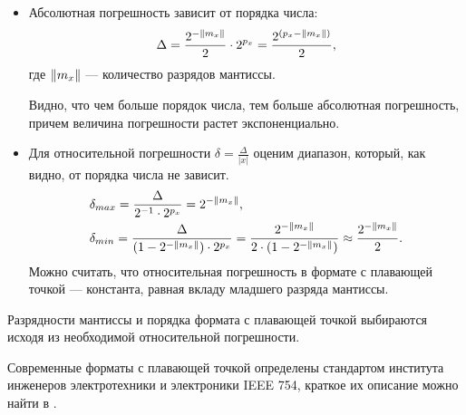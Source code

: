\begin{itemize}
    \item Абсолютная погрешность зависит от порядка числа:
    \[
        \Delta=
            \frac{2^{-\lVert m_{x}\rVert}}{2}\cdot 2^{p_{x}}=
            \frac{2^{(p_{x} - \lVert m_{x}\rVert)}}
                 {2},
    \]
    где $\lVert m_{x}\rVert$ --- количество разрядов мантиссы.
    
    Видно, что чем больше порядок числа, тем больше абсолютная погрешность, причем величина погрешности растет экспоненциально.
    
    \item Для относительной погрешности $\delta=\frac{\Delta}{|x|}$ оценим диапазон, который, как видно, от порядка числа не зависит.
    \begin{align*}
        &\delta_{max}=\frac{\Delta}{2^{-1}\cdot 2^{p_{x}}}=
            2^{-\lVert m_{x}\rVert},
        \\            
        &\delta_{min}=
            \frac{\Delta}
                 {(1-2^{-\lVert m_{x}\rVert})\cdot 2^{p_{x}}}= 
            \frac{2^{- \lVert m_{x}\rVert}}
                 {2\cdot(1-2^{-\lVert m_{x}\rVert})}\approx 
                 \frac{2^{-\lVert m_{x}\rVert}}{2}.
    \end{align*}
    Можно считать, что относительная погрешность в формате с плавающей точкой --- константа, равная вкладу младшего разряда мантиссы.
\end{itemize}

Разрядности мантиссы и порядка формата с плавающей точкой выбираются исходя из необходимой относительной погрешности.

Современные форматы с плавающей точкой определены стандартом института инженеров электротехники и электроники IEEE 754, краткое их описание можно найти в \cite{bib:zubkov:asm}.